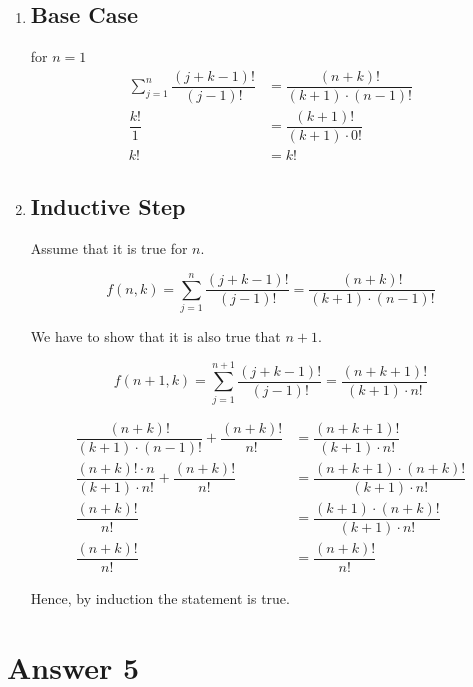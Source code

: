 \documentclass[12pt]{article}
\begin{document}
\begin{enumerate}[1)]
    \item
        \subsection*{Base Case}
            for $n=1$
            \begin{align*}
\sum_{j=1}^n \dfrac{(j+k-1)!}{(j-1)!} &= \dfrac{(n+k)!}{(k+1) \cdot (n-1)!} \\
\dfrac{k!}{1} &= \dfrac{(k+1)!}{(k+1) \cdot 0!} \\
k! &= k!
            \end{align*}
    \item 
        \subsection*{Inductive Step}
            Assume that it is true for $n$.
            
            $$f(n, k) = \sum_{j=1}^n \dfrac{(j+k-1)!}{(j-1)!} = \dfrac{(n+k)!}{(k+1) \cdot (n-1)!}$$

\pagebreak{}
            
            We have to show that it is also true that $n + 1$.
            
            $$f(n+1, k) = \sum_{j=1}^{n+1} \dfrac{(j+k-1)!}{(j-1)!} = \dfrac{(n+k+1)!}{(k+1) \cdot n!}$$
            
            \begin{align*}
\dfrac{(n+k)!}{(k+1) \cdot (n-1)!} + \dfrac{(n+k)!}{n!} &= \dfrac{(n+k+1)!}{(k+1) \cdot n!} \\
\dfrac{(n+k)! \cdot n}{(k+1) \cdot n!} + \dfrac{(n+k)!}{n!} &= \dfrac{(n+k+1) \cdot (n+k)!}{(k+1)\cdot n!} \\
\dfrac{(n+k)!}{n!} &= \dfrac{(k+1) \cdot (n+k)!}{(k+1) \cdot n!} \\
\dfrac{(n+k)!}{n!} &= \dfrac{(n+k)!}{n!}
            \end{align*}
            
            Hence, by induction the statement is true.
\end{enumerate}{}


\section*{Answer 5}
\noindent 
\end{document}
